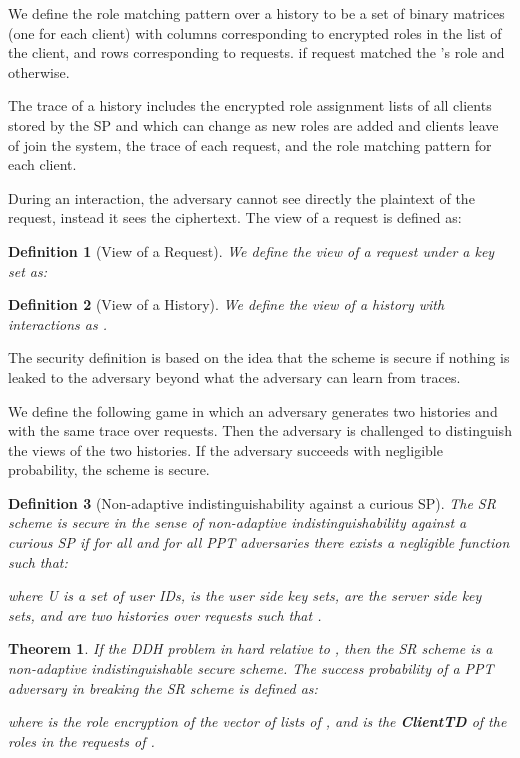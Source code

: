\documentclass[final,5p,times,twocolumn]{elsarticle}
\newtheorem{definition}{Definition}
\newtheorem{theorem}{Theorem}
\begin{document}
We define the role matching pattern  over a history  to be a set of  binary matrices (one for each client) with columns corresponding to encrypted roles in the list of the client, and rows corresponding to requests.  if request  matched the 's role and  otherwise.

The trace of a history includes the encrypted role assignment lists of all clients  stored by the SP and which can change as new roles are added and clients leave of join the system, the trace of each request, and the role matching pattern  for each client.

During an interaction, the adversary cannot see directly the plaintext of the request, instead it sees the ciphertext. The view of a request is defined as:

\begin{definition}[View of a Request]
We define the view of a request   under a key set  as: 

\end{definition}

\begin{definition}[View of a History]
We define the view of a history with  interactions  as .
\end{definition}

The security definition is based on the idea that the scheme is secure if nothing is leaked to the adversary beyond what the adversary can learn from traces.

We define the following game in which an adversary  generates two histories  and  with the same trace over  requests. Then the adversary is challenged to distinguish the views of the two histories. If the adversary succeeds with negligible probability, the scheme is secure.

\begin{definition}[Non-adaptive indistinguishability against a curious SP]
The SR scheme is secure in the sense of non-adaptive indistinguishability against a curious SP if for all  and for all PPT adversaries  there exists a negligible function  such that:

where U is a set of user IDs,  is the user side key sets,  are the server side key sets,  and  are two histories over  requests such that .
\end{definition}

\begin{theorem}\label{thm:3}
If the DDH problem in hard relative to , then the SR scheme is a non-adaptive indistinguishable secure scheme. The success probability of a PPT adversary  in breaking the SR scheme is defined as:

where  is the role encryption of the vector of lists of , and  is the \textbf{ClientTD} of the roles in the requests of .
\end{theorem}
\end{document}
